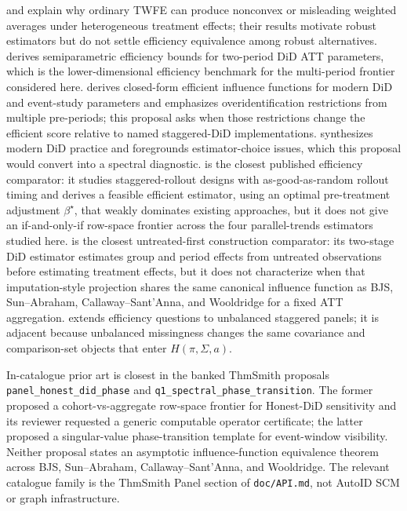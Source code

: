 \documentclass[11pt]{article}
\theoremstyle{definition}
\theoremstyle{plain}
\theoremstyle{remark}
\begin{document}
\citet{GoodmanBacon2021} and \citet{deChaisemartinDHaultfoeuille2020} explain why
ordinary TWFE can produce nonconvex or misleading weighted averages under
heterogeneous treatment effects; their results motivate robust estimators but
do not settle efficiency equivalence among robust alternatives.
\citet{SantAnnaZhao2020} derives semiparametric efficiency bounds for two-period
DiD ATT parameters, which is the lower-dimensional efficiency benchmark for the
multi-period frontier considered here.  \citet{ChenSantAnnaXie2025} derives
closed-form efficient influence functions for modern DiD and event-study
parameters and emphasizes overidentification restrictions from multiple
pre-periods; this proposal asks when those restrictions change the efficient
score relative to named staggered-DiD implementations.
\citet{RothSantAnnaBilinskiPoe2023} synthesizes modern DiD practice and
foregrounds estimator-choice issues, which this proposal would convert into a
spectral diagnostic.  \citet{RothSantAnna2023Efficient} is the closest
published efficiency comparator: it studies staggered-rollout designs with
as-good-as-random rollout timing and derives a feasible efficient estimator,
using an optimal pre-treatment adjustment \(\beta^\star\), that weakly
dominates existing approaches, but it does not give an if-and-only-if row-space
frontier across the four parallel-trends estimators studied here.
\citet{Gardner2022} is the closest untreated-first construction comparator:
its two-stage DiD estimator estimates group and period effects from untreated
observations before estimating treatment effects, but it does not characterize
when that imputation-style projection shares the same canonical influence
function as BJS, Sun--Abraham, Callaway--Sant'Anna, and Wooldridge for a fixed
ATT aggregation.  \citet{BelleGoBenatiaDortetBernadet2025} extends efficiency
questions to unbalanced staggered panels; it is adjacent because unbalanced
missingness changes the same covariance and comparison-set objects that enter
\(H(\pi,\Sigma,a)\).

In-catalogue prior art is closest in the banked ThmSmith proposals
\texttt{panel\_honest\_did\_phase} and
\texttt{q1\_spectral\_phase\_transition}.  The former proposed a cohort-vs-aggregate
row-space frontier for Honest-DiD sensitivity and its reviewer requested a
generic computable operator certificate; the latter proposed a singular-value
phase-transition template for event-window visibility.  Neither proposal states
an asymptotic influence-function equivalence theorem across BJS, Sun--Abraham,
Callaway--Sant'Anna, and Wooldridge.  The relevant catalogue family is the
ThmSmith Panel section of \texttt{doc/API.md}, not AutoID SCM or graph
infrastructure.
\end{document}
